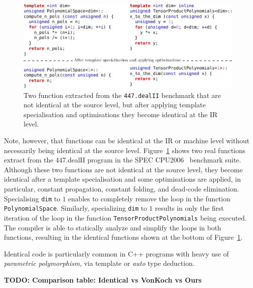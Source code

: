 \begin{figure}[h]
\centering
\includegraphics[scale=0.9]{src/relatedwork/figs/identical-example}
\caption{Two function extracted from the \texttt{447.dealII} benchmark that are not identical at the source level, but after applying template specialisation and optimisations they become identical at the IR level.}
\label{fig:identical-example}
\end{figure}

Note, however, that functions can be identical at the IR or machine level without necessarily being identical at the source level.
Figure~\ref{fig:identical-example} shows two real functions extract from the
447.dealII program in the SPEC CPU2006~\cite{spec} benchmark suite.
Although these two functions are not identical at the source level, they become
identical after a template specialisation and some optimisations are applied, in
particular, constant propagation, constant folding, and dead-code elimination. 
Specialising \verb|dim| to $1$ enables to completely remove the loop in the
function \verb|PolynomialSpace|.
Similarly, specializing \verb|dim| to $1$ results in only the first iteration
of the loop in the function \verb|TensorProductPolynomials| being executed.
The compiler is able to statically analyze and simplify the loops in both
functions, resulting in the identical functions shown at the bottom of
Figure~\ref{fig:identical-example}.

Identical code is particularly common in C++ programs
with heavy use of \textit{parametric polymorphism}, via template or \textit{auto} type deduction.







\textbf{TODO: Comparison table: Identical vs VonKoch vs Ours}





